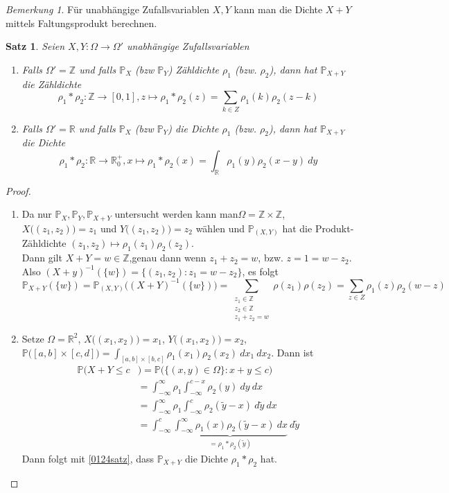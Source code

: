 \documentclass[10pt,a4paper]{article}
\newcommand{\Z}{\ensuremath{\mathbb{Z}}}
\newcommand{\R}{\ensuremath{\mathbb{R}}}
\newcommand{\Prb}{\mathbb P}
\theoremstyle{plain}
\newtheorem{satz}[theorem]{Satz}
\theoremstyle{definition}
\theoremstyle{remark}
\newtheorem*{bem*}{Bemerkung}
\begin{document}
	\begin{bem*}
		Für unabhängige Zufallsvariablen $X,Y$ kann man die Dichte $X+Y$ mittels Faltungsprodukt berechnen.
	\end{bem*}
	
	\begin{satz}\label{0326satz}
		Seien $X,Y:\Omega\to\Omega'$ unabhängige Zufallsvariablen
		\begin{enumerate}[label=\alph*)]
			\item Falls $\Omega'=\Z$ und falls $\Prb_X$ (bzw $\Prb_Y$) Zähldichte $\rho_1$ (bzw. $\rho_2$), dann hat $\Prb_{X+Y}$ die Zähldichte 
			\[\rho_1*\rho_2:\Z\to[0,1],z\mapsto\rho_1*\rho_2(z)=\sum_{k\in Z}\rho_1(k)\rho_2(z-k)\]
			\item Falls $\Omega'=\R$ und falls $\Prb_X$ (bzw $\Prb_Y$) die Dichte $\rho_1$ (bzw. $\rho_2$), dann hat $\Prb_{X+Y}$ die Dichte 
			\[\rho_1*\rho_2:\R\to\R_0^+,x\mapsto\rho_1*\rho_2(x)=\int_{\R}\rho_1(y)\rho_2(x-y)~dy\]
		\end{enumerate}
	\end{satz}
	\begin{proof}
		\begin{enumerate}[label=\alph*)]
			\item Da nur $\Prb_X,\Prb_Y,\Prb_{X+Y}$ untersucht werden kann man$\Omega=\Z\times\Z$, $X\big((z_1,z_2)\big)=z_1$ und $Y\big((z_1,z_2)\big)=z_2$ wählen und $\Prb_{(X,Y)}$ hat die Produkt-Zähldichte $(z_1,z_2)\mapsto\rho_1(z_1)\rho_2(z_2)$.\\
			Dann gilt $X+Y=w\in\Z$,genau dann wenn $z_1+z_2=w$, bzw. $z=1=w-z_2$.\\
			Also $(X+y)^{-1}(\{w\})=\{(z_1,z_2):z_1=w-z_2\}$, es folgt
			\[\Prb_{X+Y}(\{w\})=\Prb_{(X,Y)}\big((X+Y)^{-1}(\{w\})\big)=\sum_{\substack{z_1\in\Z\\z_2\in\Z\\z_1+z_2=w}}\rho(z_1)\rho(z_2)=\sum_{z\in Z}\rho_1(z)\rho_2(w-z)\]
			\item Setze $\Omega=\R^2$, $X\big((x_1,x_2)\big)=x_1$, $Y\big((x_1,x_2)\big)=x_2$, $\Prb\big([a,b]\times [c,d]\big)=\int_{[a,b]\times[b,c]}\rho_1(x_1)\rho_2(x_2)~dx_1~dx_2$.
			Dann ist 
			\begin{align*}
			\Prb(X+Y\leq c&)=\Prb\big(\{(x,y)\in\Omega\}:x+y\leq c\big)\\
			&=\int_{-\infty}^{\infty}\rho_1\int_{-\infty}^{c-x}\rho _2(y)~dy~dx\\
			&=\int_{-\infty}^{\infty}\rho_1\int_{-\infty}^{c}\rho _2(\tilde y-x)~d\tilde y~dx\\
			&=\int_{-\infty}^{c}\underbrace{\int_{-\infty}^{\infty}\rho_1(x)\rho_2(\tilde y-x)~dx}_{=\rho_1*\rho_2(\tilde y)}~d\tilde y
			\end{align*}
			Dann folgt mit \ref{0124satz}, dass $\Prb_{X+Y}$ die Dichte $\rho_1*\rho_2$ hat.
		\end{enumerate}
	\end{proof}
	
\end{document}
